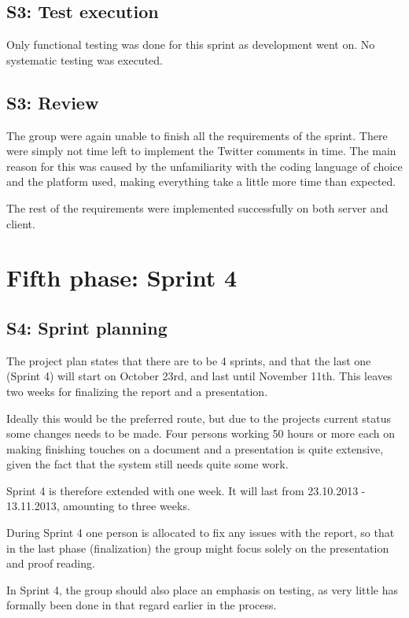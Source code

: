 \documentclass[11pt]{book}
\begin{document}
\subsection{S3: Test execution}
Only functional testing was done for this sprint as development went on. No systematic testing was executed.

\subsection{S3: Review}
The group were again unable to finish all the requirements of the sprint. There were simply not time left to implement the Twitter comments in time. The main reason for this was caused by the unfamiliarity with the coding language of choice and the platform used, making everything take a little more time than expected.

The rest of the requirements were implemented successfully on both server and client.

\section{Fifth phase: Sprint 4}

\subsection{S4: Sprint planning}
The project plan states that there are to be 4 sprints, and that the last one (Sprint 4) will start on October 23rd, and last until November 11th. This leaves two weeks for finalizing the report and a presentation.

Ideally this would be the preferred route, but due to the projects current status some changes needs to be made. Four persons working 50 hours or more each on making finishing touches on a document and a presentation is quite extensive, given the fact that the system still needs quite some work.

Sprint 4 is therefore extended with one week. It will last from 23.10.2013 - 13.11.2013, amounting to three weeks.

During Sprint 4 one person is allocated to fix any issues with the report, so that in the last phase (finalization) the group might focus solely on the presentation and proof reading.

In Sprint 4, the group should also place an emphasis on testing, as very little has formally been done in that regard earlier in the process.
\end{document}
